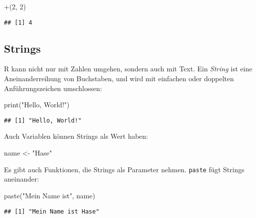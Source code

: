 \documentclass[11pt,german,a4paper]{article}
\newenvironment{Shaded}{\begin{snugshade}}{\end{snugshade}}
\newcommand{\AttributeTok}[1]{\textcolor[rgb]{0.77,0.63,0.00}{#1}}
\newcommand{\DecValTok}[1]{\textcolor[rgb]{0.00,0.00,0.81}{#1}}
\newcommand{\FunctionTok}[1]{\textcolor[rgb]{0.00,0.00,0.00}{#1}}
\newcommand{\NormalTok}[1]{#1}
\newcommand{\OtherTok}[1]{\textcolor[rgb]{0.56,0.35,0.01}{#1}}
\newcommand{\StringTok}[1]{\textcolor[rgb]{0.31,0.60,0.02}{#1}}
\begin{document}
\begin{Shaded}
\begin{Highlighting}[]
\StringTok{\textasciigrave{}}\AttributeTok{+}\StringTok{\textasciigrave{}}\NormalTok{(}\DecValTok{2}\NormalTok{, }\DecValTok{2}\NormalTok{)}
\end{Highlighting}
\end{Shaded}

\begin{verbatim}
## [1] 4
\end{verbatim}

\hypertarget{strings}{%
\subsection{Strings}\label{strings}}

R kann nicht nur mit Zahlen umgehen, sondern auch mit Text. Ein \emph{String} ist eine Aneinanderreihung von Buchstaben, und wird mit einfachen oder doppelten Anführungszeichen umschlossen:

\begin{Shaded}
\begin{Highlighting}[]
\FunctionTok{print}\NormalTok{(}\StringTok{"Hello, World!"}\NormalTok{)}
\end{Highlighting}
\end{Shaded}

\begin{verbatim}
## [1] "Hello, World!"
\end{verbatim}

Auch Variablen können Strings als Wert haben:

\begin{Shaded}
\begin{Highlighting}[]
\NormalTok{name }\OtherTok{\textless{}{-}} \StringTok{"Hase"}
\end{Highlighting}
\end{Shaded}

Es gibt auch Funktionen, die Strings als Parameter nehmen. \texttt{paste} fügt Strings aneinander:

\begin{Shaded}
\begin{Highlighting}[]
\FunctionTok{paste}\NormalTok{(}\StringTok{"Mein Name ist"}\NormalTok{, name)}
\end{Highlighting}
\end{Shaded}

\begin{verbatim}
## [1] "Mein Name ist Hase"
\end{verbatim}
\end{document}
